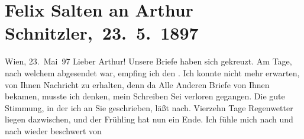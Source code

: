 

         
         \renewcommand{\erwaehntePersonen}{Personen: Richard Beer-Hofmann,  Elisabeth von Österreich-Ungarn,  Franz Joseph I. von Österreich-Ungarn, Paul Goldmann, Hugo von Hofmannsthal, Richard Metzl, Louise Metzl, Felix Salten, Ottilie Salten, Adele Sandrock}
         \renewcommand{\erwaehnteInstitutionen}{Institutionen: Franz-Joseph-Orden}
         \renewcommand{\erwaehnteOrte}{Orte: London, Ostsee, Paris, Riga, Russland, Wien}
         \renewcommand{\erwaehnteWerke}{}
               \section[ Felix Salten an Arthur Schnitzler, 23. 5. 1897]{ Felix Salten an Arthur Schnitzler, 23. 5. 1897}\nopagebreak{}\rehead{ }\begin{ledgroupsized}[t]{13cm}\normalsize\beginnumbering{} \toendnotes[C]{\smallbreak\pagebreak[2]} 
\toendnotes[C]{\smallbreak}\pstart
           \raggedleft{}{\pb}Wien, 23. Mai 97\pend
           \pstart
           Lieber Arthur! Unsere Briefe haben sich gekreuzt. Am Tage, nach
               welchem \label{K_L03266-1v}\label{K_L03266-1h} abgesendet war, empfing ich den \label{K_L03266-2v}\label{K_L03266-2h}. Ich konnte nicht mehr erwarten, von
               Ihnen Nachricht zu erhalten, denn da Alle Anderen Briefe von Ihnen bekamen, musste
               ich denken, mein Schreiben Sei verloren gegangen.\pend
           \pstart
           Die gute Stimmung, in der ich \label{K_L03266-3v}\label{K_L03266-3h} an Sie geschrieben, läßt nach. Vierzehn Tage Regenwetter liegen dazwischen,
               und der Frühling hat nun ein Ende. Ich fühle mich nach und nach wieder beschwert von

\end{ledgroupsized}
